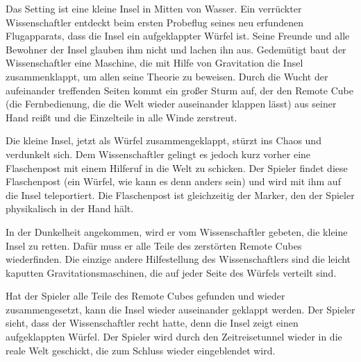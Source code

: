 
Das Setting ist eine kleine Insel in Mitten von Wasser. Ein verrückter Wissenschaftler entdeckt beim ersten Probeflug seines neu erfundenen Flugapparats, dass die Insel ein aufgeklappter Würfel ist. Seine Freunde und alle Bewohner der Insel glauben ihm nicht und lachen ihn aus. Gedemütigt baut der Wissenschaftler eine Maschine, die mit Hilfe von Gravitation die Insel zusammenklappt, um allen seine Theorie zu beweisen. Durch die Wucht der aufeinander treffenden Seiten kommt ein großer Sturm auf, der den Remote Cube (die Fernbedienung, die die Welt wieder auseinander klappen lässt) aus seiner Hand reißt und die Einzelteile in alle Winde zerstreut.

Die kleine Insel, jetzt als Würfel zusammengeklappt, stürzt ins Chaos und verdunkelt sich. Dem Wissenschaftler gelingt es jedoch kurz vorher eine Flaschenpost mit einem Hilferuf in die Welt zu schicken. Der Spieler findet diese Flaschenpost (ein Würfel, wie kann es denn anders sein) und wird mit ihm auf die Insel teleportiert. Die Flaschenpost ist gleichzeitig der Marker, den der Spieler physikalisch in der Hand hält. 

In der Dunkelheit angekommen, wird er vom Wissenschaftler gebeten, die kleine Insel zu retten. Dafür muss er alle Teile des zerstörten Remote Cubes wiederfinden. Die einzige andere Hilfestellung des Wissenschaftlers sind die leicht kaputten Gravitationsmaschinen, die auf jeder Seite des Würfels verteilt sind.

Hat der Spieler alle Teile des Remote Cubes gefunden und wieder zusammengesetzt, kann die Insel wieder auseinander geklappt werden. Der Spieler sieht, dass der Wissenschaftler recht hatte, denn die Insel zeigt einen aufgeklappten Würfel. Der Spieler wird durch den Zeitreisetunnel wieder in die reale Welt geschickt, die zum Schluss wieder eingeblendet wird.